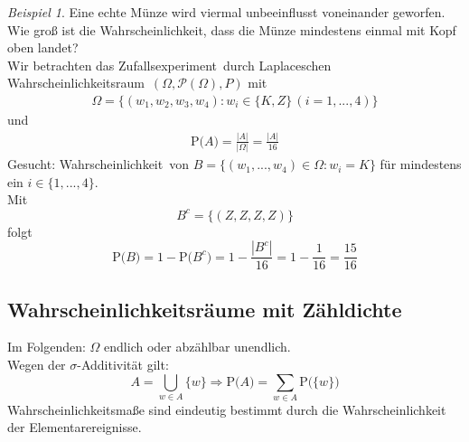 \documentclass[a4paper,12pt,fleqn]{scrartcl}
\newcommand{\m}[1]{\mathcal{ #1 }}
\newcommand{\p}[1]{\text{P(} #1 \text{)}}
\newcommand{\ZE}{Zufallsexperiment}
\newcommand{\WR}{Wahrscheinlichkeitsraum}
\newcommand{\WM}{Wahrscheinlichkeitsmaß}
\newcommand{\Wk}{Wahrscheinlichkeit}
\newcommand{\impl}{\Rightarrow}
\theoremstyle{definition}
\theoremstyle{plain}
\theoremstyle{remark}
\newtheorem{beispiel}[definition]{Beispiel}
\begin{document}
\begin{beispiel}
Eine echte Münze wird viermal unbeeinflusst voneinander geworfen. Wie groß ist die Wahrscheinlichkeit, dass die Münze mindestens einmal mit Kopf oben landet? \\
Wir betrachten das \ZE \, durch Laplaceschen \WR \, $( \Omega , \m{P}(\Omega)  , P)$ mit 
\begin{align*}
\Omega = \{ (w_1, w_2, w_3, w_4) : w_i \in \{ K , Z \} \, (i = 1,...,4) \} 
\end{align*} 
und 
\begin{align*}
 \p{A} = \frac{|A|}{|\Omega|} = \frac{|A|}{16}
\end{align*}
Gesucht: \Wk \, von  $B = \{ (w_1,...,w_4) \in \Omega : w_i = K \} $ für mindestens ein $ i \in \{1,...,4 \} $. \\
Mit 
\[B^c = \{ (Z,Z,Z,Z) \} \]
folgt
\[\p{B} = 1- \p{B^c} = 1- \frac{|B^c|}{16} = 1- \frac{1}{16} = \frac{15}{16}\]
\end{beispiel}

\subsection{Wahrscheinlichkeitsräume mit Zähldichte}

Im Folgenden: $\Omega$ endlich oder abzählbar unendlich. \\
Wegen der $\sigma$-Additivität gilt:
\[A = \bigcup_{w \in A} \{w\} \impl \p{A} = \sum_{w \in A} \p{\{w\}}\]
\WM e sind eindeutig bestimmt durch die \Wk \, der Elementarereignisse.
\end{document}

